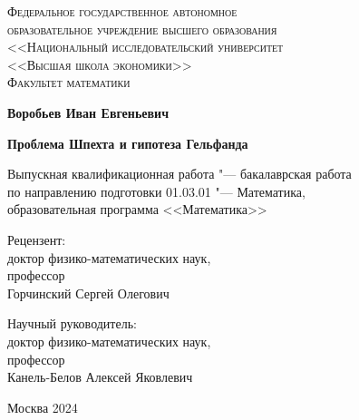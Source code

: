 \documentclass[12pt,a4paper]{article}
\begin{document}
    \begin{center}
    {\scshape Федеральное государственное автономное\\
    образовательное учреждение высшего образования\\
        <<Национальный исследовательский университет\\
        <<Высшая школа экономики>>\\[1ex]
    Факультет математики\par}

        \par\vfill

        \textbf{\large Воробьев Иван Евгеньевич}

        \vspace{1.5cm}

        {\Large\bfseries
        Проблема Шпехта и гипотеза Гельфанда
        \par}

        \vspace{1.5cm}

        Выпускная квалификационная работа "--- бакалаврская работа\\[1ex]
        по направлению подготовки 01.03.01 "--- Математика,\\[1ex]
        образовательная программа <<Математика>>
        \par\vfill
        \noindent\parbox[t]{0.48\textwidth}{%
            Рецензент:\\[3pt]
            доктор физико-математических наук,\\
            профессор\\
            Горчинский Сергей Олегович
        }\hspace{0.04\textwidth}\parbox[t]{0.48\textwidth}{%
            Научный руководитель:\\[3pt]
            доктор физико-математических наук,\\
            профессор\\
            Канель-Белов Алексей Яковлевич\\[2ex]
        }%
        \par\vfill
        Москва 2024
    \end{center}
    \thispagestyle{empty}
    \pagebreak
\end{document}
